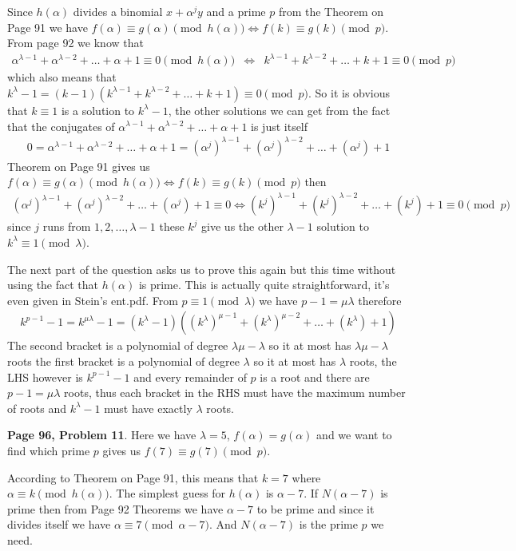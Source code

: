 \documentclass[aps,preprint,preprintnumbers,nofootinbib,showpacs,prd]{revtex4-1}
\newcommand{\nbea}{\begin{eqnarray*}}
\newcommand{\neea}{\end{eqnarray*}}
\begin{document}
Since $h(\alpha)$ divides a binomial $x + \alpha^j y$ and a prime $p$ from the Theorem on Page 91 we have $f(\alpha) \equiv g(\alpha) \pmod{h(\alpha)} \Longleftrightarrow f(k) \equiv g(k) \pmod{p}$. From page 92 we know that
%
\nbea
\alpha^{\lambda - 1} + \alpha^{\lambda - 2} + \dots + \alpha + 1 \equiv 0 \pmod{h(\alpha)} & \Longleftrightarrow & k^{\lambda - 1} + k^{\lambda - 2} + \dots + k + 1 \equiv 0 \pmod{p}
\neea
%
which also means that $k^\lambda - 1 = (k-1)(k^{\lambda - 1} + k^{\lambda - 2} + \dots + k + 1) \equiv 0 \pmod{p}$. So it is obvious that $k \equiv 1$ is a solution to $k^\lambda - 1$, the other solutions we can get from the fact that the conjugates of $\alpha^{\lambda - 1} + \alpha^{\lambda - 2} + \dots + \alpha + 1$ is just itself
%
\nbea
0 = \alpha^{\lambda - 1} + \alpha^{\lambda - 2} + \dots + \alpha + 1 = (\alpha^j)^{\lambda - 1} + (\alpha^j)^{\lambda - 2} + \dots + (\alpha^j) + 1
\neea
%
Theorem on Page 91 gives us $f(\alpha) \equiv g(\alpha) \pmod{h(\alpha)} \Longleftrightarrow f(k) \equiv g(k) \pmod{p}$ then 
%
\nbea
(\alpha^j)^{\lambda - 1} + (\alpha^j)^{\lambda - 2} + \dots + (\alpha^j) + 1 \equiv 0 \Longleftrightarrow (k^j)^{\lambda - 1} + (k^j)^{\lambda - 2} + \dots + (k^j) + 1 \equiv 0 \pmod{p}
\neea
%
since $j$ runs from $1,2,\dots, \lambda-1$ these $k^j$ give us the other $\lambda - 1$ solution to $k^\lambda \equiv 1 \pmod{\lambda}$.

The next part of the question asks us to prove this again but this time without using the fact that $h(\alpha)$ is prime. This is actually quite straightforward, it's even given in Stein's ent.pdf. From $p \equiv 1 \pmod{\lambda}$ we have $p - 1 = \mu\lambda$ therefore
%
\nbea
k^{p-1} - 1 = k^{\mu\lambda} - 1 = (k^\lambda - 1)((k^\lambda)^{\mu-1} + (k^\lambda)^{\mu - 2} + \dots + (k^\lambda) + 1)
\neea
%
The second bracket is a polynomial of degree $\lambda\mu - \lambda$ so it at most has $\lambda\mu - \lambda$ roots the first bracket is a polynomial of degree $\lambda$ so it at most has $\lambda$ roots, the LHS however is $k^{p-1} - 1$ and every remainder of $p$ is a root and there are $p - 1 = \mu\lambda$ roots, thus each bracket in the RHS must have the maximum number of roots and $k^\lambda - 1$ must have exactly $\lambda$ roots.

{\bf Page 96, Problem 11}. Here we have $\lambda = 5$, $f(\alpha) = g(\alpha)$ and we want to find which prime $p$ gives us $f(7) \equiv g(7) \pmod{p}$.

According to Theorem on Page 91, this means that $k = 7$ where $\alpha \equiv k \pmod{h(\alpha)}$. The simplest guess for $h(\alpha)$ is $\alpha - 7$. If $N(\alpha - 7)$ is prime then from Page 92 Theorems we have $\alpha - 7$ to be prime and since it divides itself we have $\alpha \equiv 7 \pmod{\alpha - 7}$. And $N(\alpha - 7)$ is the prime $p$ we need.
\end{document}
